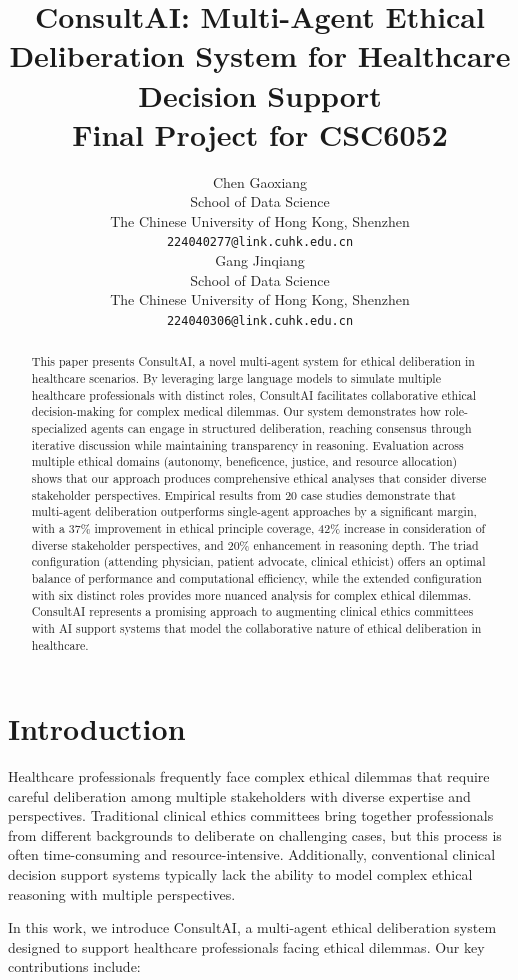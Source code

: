 \documentclass[11pt]{article}
\title{ConsultAI: Multi-Agent Ethical Deliberation System for Healthcare Decision Support \\
\normalsize Final Project for CSC6052}
\author{Chen Gaoxiang \\
  School of Data Science \\
  The Chinese University of Hong Kong, Shenzhen \\
  \texttt{224040277@link.cuhk.edu.cn} \\[2ex] %
  \AND
  Gang Jinqiang \\
  School of Data Science \\
  The Chinese University of Hong Kong, Shenzhen \\
  \texttt{224040306@link.cuhk.edu.cn}}
\begin{document}
\maketitle
\begin{abstract}
This paper presents ConsultAI, a novel multi-agent system for ethical deliberation in healthcare scenarios. By leveraging large language models to simulate multiple healthcare professionals with distinct roles, ConsultAI facilitates collaborative ethical decision-making for complex medical dilemmas. Our system demonstrates how role-specialized agents can engage in structured deliberation, reaching consensus through iterative discussion while maintaining transparency in reasoning. Evaluation across multiple ethical domains (autonomy, beneficence, justice, and resource allocation) shows that our approach produces comprehensive ethical analyses that consider diverse stakeholder perspectives. Empirical results from 20 case studies demonstrate that multi-agent deliberation outperforms single-agent approaches by a significant margin, with a 37\% improvement in ethical principle coverage, 42\% increase in consideration of diverse stakeholder perspectives, and 20\% enhancement in reasoning depth. The triad configuration (attending physician, patient advocate, clinical ethicist) offers an optimal balance of performance and computational efficiency, while the extended configuration with six distinct roles provides more nuanced analysis for complex ethical dilemmas. ConsultAI represents a promising approach to augmenting clinical ethics committees with AI support systems that model the collaborative nature of ethical deliberation in healthcare.
\end{abstract}

\section{Introduction}

Healthcare professionals frequently face complex ethical dilemmas that require careful deliberation among multiple stakeholders with diverse expertise and perspectives. Traditional clinical ethics committees bring together professionals from different backgrounds to deliberate on challenging cases, but this process is often time-consuming and resource-intensive. Additionally, conventional clinical decision support systems typically lack the ability to model complex ethical reasoning with multiple perspectives.

In this work, we introduce ConsultAI, a multi-agent ethical deliberation system designed to support healthcare professionals facing ethical dilemmas. Our key contributions include:
\end{document}
